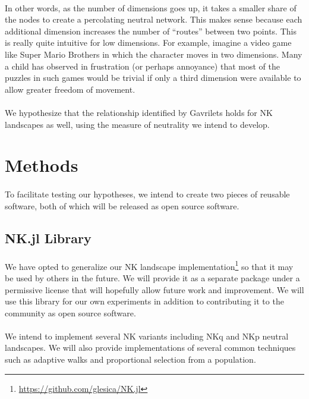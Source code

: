 \documentclass[12pt,letterpaper,titlepage]{article}
\begin{document}
\paragraph{}
In other words, as the number of dimensions goes up, it takes a smaller share
of the nodes to create a percolating neutral network. This makes sense because
each additional dimension increases the number of ``routes'' between two
points. This is really quite intuitive for low dimensions. For example, imagine
a video game like Super Mario Brothers in which the character moves in two
dimensions. Many a child has observed in frustration (or perhaps annoyance)
that most of the puzzles in such games would be trivial if only a third
dimension were available to allow greater freedom of movement.

\paragraph{}
We hypothesize that the relationship identified by Gavrilets holds for NK
landscapes as well, using the measure of neutrality we intend to develop.

\section{Methods}

\paragraph{}
To facilitate testing our hypotheses, we intend to create two pieces of
reusable software, both of which will be released as open source software.

\subsection{NK.jl Library}

\paragraph{}
We have opted to generalize our NK landscape
implementation\footnote{\url{https://github.com/glesica/NK.jl}} so that it may
be used by others in the future. We will provide it as a separate package under
a permissive license that will hopefully allow future work and improvement.  We
will use this library for our own experiments in addition to contributing it to
the community as open source software.

\paragraph{}
We intend to implement several NK variants including NKq and NKp neutral
landscapes. We will also provide implementations of several common techniques
such as adaptive walks and proportional selection from a population.
\end{document}
